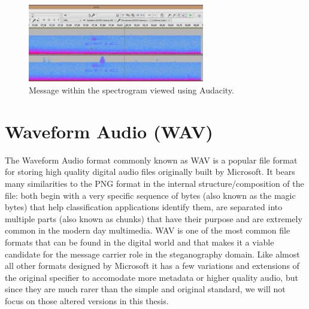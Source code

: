 \begin{multicols*}{2}
\begin{figure}[H]
    \centering
    \includegraphics[width=7.7cm,keepaspectratio]{pics/audio_chapter/spectrogram_encoding.jpg}
    \caption{Message within the spectrogram viewed using Audacity.}
    \label{battlefield_spectrogram_easter_egg}
\end{figure}


\section{Waveform Audio (WAV)}
The Waveform Audio format commonly known as WAV is a popular file format for storing high quality digital audio files originally built by Microsoft. It bears many similarities to the PNG format in the internal structure/composition of the file: both begin with a very specific sequence of bytes (also known as the magic bytes) that help classification applications identify them, are separated into multiple parts (also known as chunks) that have their purpose and are extremely common in the modern day multimedia. WAV is one of the most common file formats that can be found in the digital world and that makes it a viable candidate for the message carrier role in the steganography domain. Like almost all other formats designed by Microsoft it has a few variations and extensions of the original specifier to accomodate more metadata or higher quality audio, but since they are much rarer than the simple and original standard, we will not focus on those altered versions in this thesis.


\end{multicols*}
